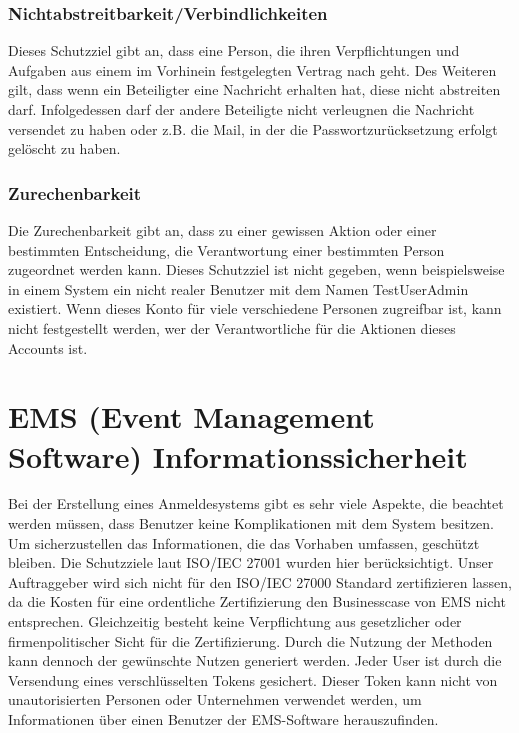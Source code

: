\subsubsection{Nichtabstreitbarkeit/Verbindlichkeiten}
Dieses Schutzziel gibt an, dass eine Person, die ihren Verpflichtungen und Aufgaben aus einem im Vorhinein festgelegten Vertrag nach geht. Des Weiteren gilt, dass wenn ein Beteiligter eine Nachricht erhalten hat, diese nicht abstreiten darf. Infolgedessen darf der andere Beteiligte nicht verleugnen die Nachricht versendet zu haben oder z.B. die Mail, in der die Passwortzurücksetzung erfolgt gelöscht zu haben.

\subsubsection{Zurechenbarkeit}
Die Zurechenbarkeit gibt an, dass zu einer gewissen Aktion oder einer bestimmten Entscheidung, die Verantwortung einer bestimmten Person zugeordnet werden kann. Dieses Schutzziel ist nicht gegeben, wenn beispielsweise in einem System ein nicht realer Benutzer mit dem Namen TestUserAdmin existiert. Wenn dieses Konto für viele verschiedene Personen zugreifbar ist, kann nicht festgestellt werden, wer der Verantwortliche für die Aktionen dieses Accounts ist.

\section{EMS (Event Management Software) Informationssicherheit}
Bei der Erstellung eines Anmeldesystems gibt es sehr viele Aspekte, die beachtet werden müssen, dass Benutzer keine Komplikationen mit dem System besitzen. Um sicherzustellen das Informationen, die das Vorhaben umfassen, geschützt bleiben. Die Schutzziele laut ISO/IEC 27001 wurden hier berücksichtigt. Unser Auftraggeber wird sich nicht für den ISO/IEC 27000 Standard zertifizieren lassen, da die Kosten für eine ordentliche Zertifizierung den Businesscase von EMS nicht entsprechen. Gleichzeitig besteht keine Verpflichtung aus gesetzlicher oder firmenpolitischer Sicht für die Zertifizierung. Durch die Nutzung der Methoden kann dennoch der gewünschte Nutzen generiert werden.
Jeder User ist durch die Versendung eines verschlüsselten Tokens gesichert. Dieser Token kann nicht von unautorisierten Personen oder Unternehmen verwendet werden, um Informationen über einen Benutzer der EMS-Software herauszufinden. 

